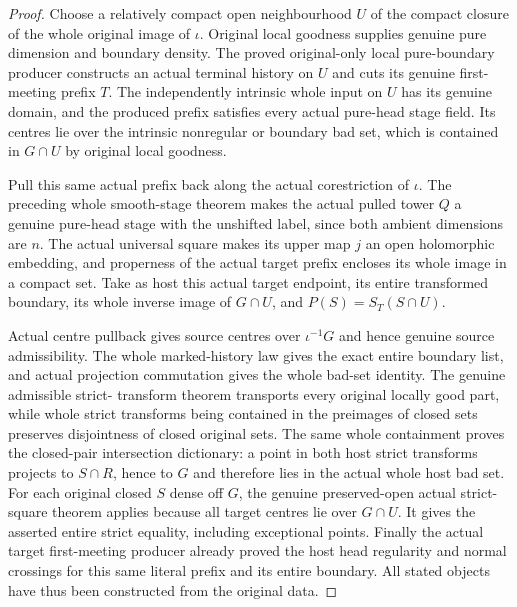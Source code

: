 \begin{proof}
Choose a relatively compact open neighbourhood $U$ of the compact
closure of the whole original image of $\iota$. Original local
goodness supplies genuine pure dimension and boundary density. The
proved original-only local pure-boundary producer constructs an actual
terminal history on $U$ and cuts its genuine first-meeting prefix
$T$. The independently intrinsic whole input on $U$ has its genuine
domain, and the produced prefix satisfies every actual pure-head
stage field. Its centres lie over the intrinsic nonregular or boundary
bad set, which is contained in $G\cap U$ by original local goodness.

Pull this same actual prefix back along the actual corestriction of
$\iota$. The preceding whole smooth-stage theorem makes the actual
pulled tower $Q$ a genuine pure-head stage with the unshifted label,
since both ambient dimensions are $n$. The actual universal square
makes its upper map $j$ an open holomorphic embedding, and properness
of the actual target prefix encloses its whole image in a compact set.
Take as host this actual target endpoint, its entire transformed
boundary, its whole inverse image of $G\cap U$, and
$P(S)=S_T(S\cap U)$.

Actual centre pullback gives source centres over $\iota^{-1}G$ and
hence genuine source admissibility. The whole marked-history law gives
the exact entire boundary list, and actual projection commutation
gives the whole bad-set identity. The genuine admissible strict-
transform theorem transports every original locally good part, while
whole strict transforms being contained in the preimages of closed
sets preserves disjointness of closed original sets. The same whole
containment proves the closed-pair intersection dictionary: a point in
both host strict transforms projects to $S\cap R$, hence to $G$ and
therefore lies in the actual whole host bad set. For each original
closed $S$ dense off $G$, the genuine preserved-open actual strict-
square theorem applies because all target centres lie over $G\cap U$.
It gives the asserted entire strict equality, including exceptional
points. Finally the actual target first-meeting producer already
proved the host head regularity and normal crossings for this same
literal prefix and its entire boundary. All stated objects have thus
been constructed from the original data.
\end{proof}
